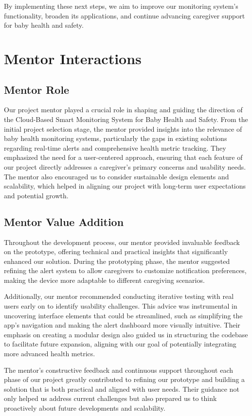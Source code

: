 \documentclass[12pt,a4paper]{report}
\begin{document}
By implementing these next steps, we aim to improve our monitoring system’s functionality, broaden its applications, and continue advancing caregiver support for baby health and safety.

\chapter{Mentor Interactions}
\section{Mentor Role}
Our project mentor played a crucial role in shaping and guiding the direction of the Cloud-Based Smart Monitoring System for Baby Health and Safety. From the initial project selection stage, the mentor provided insights into the relevance of baby health monitoring systems, particularly the gaps in existing solutions regarding real-time alerts and comprehensive health metric tracking. They emphasized the need for a user-centered approach, ensuring that each feature of our project directly addresses a caregiver’s primary concerns and usability needs. The mentor also encouraged us to consider sustainable design elements and scalability, which helped in aligning our project with long-term user expectations and potential growth.

\section{Mentor Value Addition}
Throughout the development process, our mentor provided invaluable feedback on the prototype, offering technical and practical insights that significantly enhanced our solution. During the prototyping phase, the mentor suggested refining the alert system to allow caregivers to customize notification preferences, making the device more adaptable to different caregiving scenarios.

Additionally, our mentor recommended conducting iterative testing with real users early on to identify usability challenges. This advice was instrumental in uncovering interface elements that could be streamlined, such as simplifying the app’s navigation and making the alert dashboard more visually intuitive. Their emphasis on creating a modular design also guided us in structuring the codebase to facilitate future expansion, aligning with our goal of potentially integrating more advanced health metrics.

The mentor’s constructive feedback and continuous support throughout each phase of our project greatly contributed to refining our prototype and building a solution that is both practical and aligned with user needs. Their guidance not only helped us address current challenges but also prepared us to think proactively about future developments and scalability.

\newpage
\renewcommand{\bibname}{References}


\printbibliography
\end{document}
